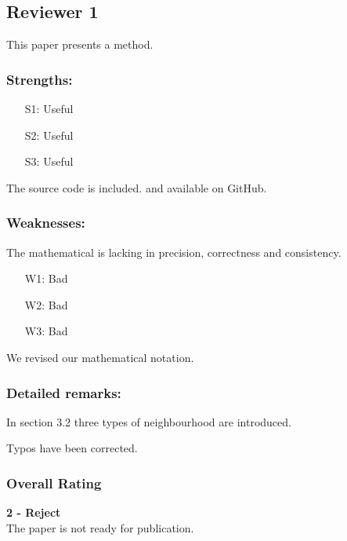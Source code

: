 \subsection{Reviewer 1} \label{sec:rev:1}

This paper presents a method.

\subsubsection*{Strengths:}

\begin{itemize}[itemsep=1pt,parsep=1pt]
    \item[S1:] Useful
    \item[S2:] Useful
    \item[S3:] Useful
\end{itemize}

\noindent The source code is included. and available on GitHub.


\subsubsection*{Weaknesses:}

The mathematical is lacking in precision, correctness and consistency.

\begin{itemize}[itemsep=1pt,parsep=1pt]
    \item[W1:] Bad
    \item[W2:] Bad
    \item[W3:] Bad
\end{itemize}

\begin{response} \label{res:rev1:weak:math}
We revised our mathematical notation.
\end{response}


\subsubsection*{Detailed remarks:}

In section 3.2 three types of neighbourhood are introduced.

\begin{response} \label{res:rev1:detail:types}
Typos have been corrected.
\end{response}


\subsubsection*{Overall Rating}
\textbf{2 - Reject} \\
The paper is not ready for publication.

